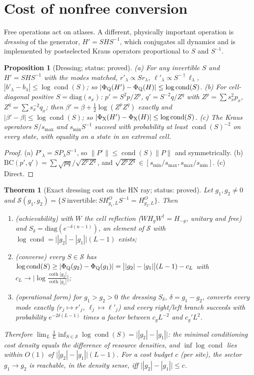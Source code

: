 \documentclass[11pt]{article}
\newtheorem{theorem}{Theorem}
\newtheorem{proposition}{Proposition}
\newcommand{\PhiQ}{\Phi_{\rm Q}}
\newcommand{\PhiX}{\Phi_{\rm X}}
\newcommand{\BC}{\mathrm{BC}}
\newcommand{\cond}{\operatorname{cond}}
\begin{document}
\section{Cost of nonfree conversion}
Free operations act on atlases. A different, physically important operation is \emph{dressing} of the generator, $H'=SHS^{-1}$, which conjugates all dynamics and is implemented by postselected Kraus operators proportional to $S$ and $S^{-1}$.
\begin{proposition}[Dressing; status: proved]\label{prop:dress}
(a) For any invertible $S$ and $H'=SHS^{-1}$ with the modes matched, $r'_\lambda\propto Sr_\lambda$, $\ell'_\lambda\propto S^{-\dagger}\ell_\lambda$, $|b'_\lambda-b_\lambda|\le\log\cond(S)$; so $|\PhiQ(H')-\PhiQ(H)|\le\log\cond(S)$.
(b) For cell-diagonal positive $S=\mathrm{diag}(s_x)$: $p'=S^2p/Z^p$, $q'=S^{-2}q/Z^q$ with $Z^p=\sum s_x^2p_x$, $Z^q=\sum s_x^{-2}q_x$; then $\beta'=\beta+\tfrac12\log(Z^pZ^q)$ exactly and $|\beta'-\beta|\le\log\cond(S)$; so $|\PhiX(H')-\PhiX(H)|\le\log\cond(S)$.
(c) The Kraus operators $S/s_{\max}$ and $s_{\min}S^{-1}$ succeed with probability at least $\cond(S)^{-2}$ on every state, with equality on a state in an extremal cell.
\end{proposition}
\begin{proof}
(a) $P'_\lambda=SP_\lambda S^{-1}$, so $\|P'\|\le\cond(S)\|P\|$ and symmetrically. (b) $\BC(p',q')=\sum\sqrt{pq}/\sqrt{Z^pZ^q}$, and $\sqrt{Z^pZ^q}\in[s_{\min}/s_{\max},s_{\max}/s_{\min}]$. (c) Direct.
\end{proof}
\begin{theorem}[Exact dressing cost on the HN ray; status: proved]\label{thm:cost}
Let $g_1,g_2\ne0$ and $\mathcal S(g_1,g_2)=\{S\ \text{invertible}:SH^O_{g_1,L}S^{-1}=H^O_{g_2,L}\}$. Then
\begin{enumerate}
\item[(i)] (achievability) with $W$ the cell reflection ($WH_gW^\dagger=H_{-g}$, unitary and free) and $S_\delta=\mathrm{diag}(e^{-\delta(n-1)})$, an element of $\mathcal S$ with
$\log\cond=\big||g_2|-|g_1|\big|(L-1)$ exists;
\item[(ii)] (converse) every $S\in\mathcal S$ has $\log\cond(S)\ge|\PhiQ(g_2)-\PhiQ(g_1)|=\big||g_2|-|g_1|\big|(L-1)-c_L$ with $c_L\to\big|\log\frac{\coth|g_2|}{\coth|g_1|}\big|$;
\item[(iii)] (operational form) for $g_1>g_2>0$ the dressing $S_\delta$, $\delta=g_1-g_2$, converts every mode exactly ($r_j\mapsto r'_j$, $\ell_j\mapsto\ell'_j$) and every right/left branch succeeds with probability $e^{-2\delta(L-1)}$ times a factor between $c_gL^{-2}$ and $c_g'L^{2}$.
\end{enumerate}
Therefore $\lim_{L}\frac1L\inf_{S\in\mathcal S}\log\cond(S)=\big||g_2|-|g_1|\big|$: the minimal conditioning cost density equals the difference of resource densities, and $\inf\log\cond$ lies within $O(1)$ of $\big||g_2|-|g_1|\big|(L-1)$. For a cost budget $c$ (per site), the sector $g_1\to g_2$ is reachable, in the density sense, iff $\big||g_2|-|g_1|\big|\le c$.
\end{theorem}
\end{document}
